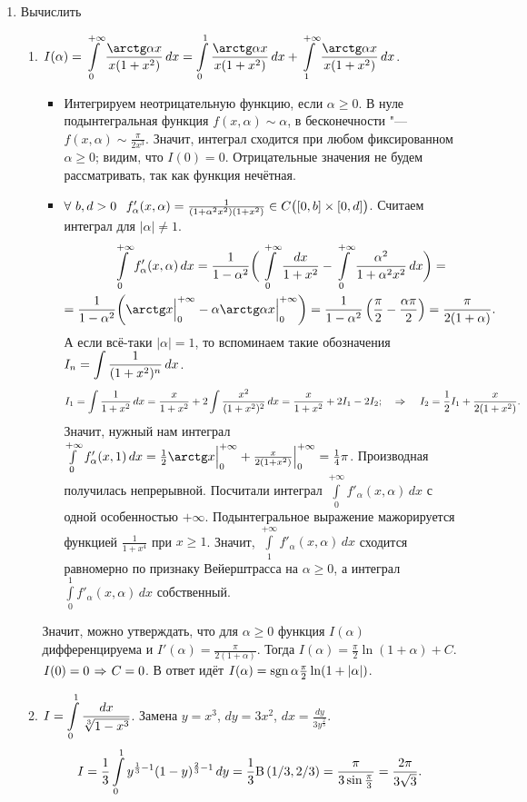 \documentclass{article}
\begin{document}
\begin{enumerate}
\item Вычислить
\begin{enumerate}
\item $I(\alpha)=\ds\int\limits_0^{+\infty}\frac{\arctg\alpha x}{x(1+x^2)}\,dx=\int\limits_0^{1}\frac{\arctg\alpha x}{x(1+x^2)}\,dx+\int\limits_1^{+\infty}\frac{\arctg\alpha x}{x(1+x^2)}\,dx$.
\begin{itemize}
\item Интегрируем неотрицательную функцию, если $\alpha\ge0$. В нуле подынтегральная функция $f(x,\alpha)\sim \alpha$, в бесконечности "--- $f(x,\alpha)\sim \frac{\pi}{2x^3}$. Значит, интеграл сходится при любом фиксированном $\alpha\ge0$; видим, что $I(0)=0$. Отрицательные значения не будем рассматривать, так как функция нечётная.
\item $\forall\ b,d>0\hskip .75em plus.1em minus.08em\relax f'_{\alpha}(x,\alpha)=\frac1{(1+\alpha^2x^2)(1+x^2)}\in C\big([0,b]\times[0,d]\big)$. Считаем интеграл для $|\alpha|\ne1$.
\begin{multline*}\intop_0^{+\infty}f'_{\alpha}(x,\alpha)\,dx=\frac1{1-\alpha^2}\bigg(\intop_0^{+\infty}\frac{dx}{1+x^2}-\intop_0^{+\infty}\frac{\alpha^2}{1+\alpha^2x^2}\,dx\bigg)=\\
=\frac1{1-\alpha^2}\bigg(\arctg x\Big|_0^{+\infty}-\alpha\arctg\alpha x\Big|_0^{+\infty}\bigg)=\frac1{1-\alpha^2}\left(\frac{\pi}2-\frac{\alpha\pi}2\right)=\frac{\pi}{2(1+\alpha)}.\end{multline*}
А если всё-таки $|\alpha|=1$, то вспоминаем такие обозначения $I_n=\displaystyle\int\frac1{(1+x^2)^n}\,dx$.
\[I_1=\int\frac{1}{1+x^2}\,dx=\frac x{1+x^2}+2\int \frac{x^2}{(1+x^2)^2}\,dx=\frac x{1+x^2}+2I_1-2I_2;\quad\hspace{1pt plus1pt}\Rightarrow\hspace{1pt plus1pt}\quad I_2=\frac12I_1+\frac x{2(1+x^2)}.\]
Значит, нужный нам интеграл $\int\limits_0^{+\infty}f'_{\alpha}(x,1)\,dx=\frac12\arctg x\Big|_0^{+\infty}+\frac{x}{2(1+x^2)}\Big|_0^{+\infty}=\frac14\pi$. Производная получилась непрерывной. Посчитали интеграл $\int\limits_0^{+\infty}f'_{\alpha}(x,\alpha)\,dx$ с одной особенностью $+\infty$. Подынтегральное выражение мажорируется функцией $\frac1{1+x^4}$ при $x\ge1$. Значит, $\int\limits_1^{+\infty}f'_{\alpha}(x,\alpha)\,dx$ сходится равномерно по признаку Вейерштрасса на $\alpha\ge0$, а интеграл $\int\limits_0^1f'_{\alpha}(x,\alpha)\,dx$ собственный.
\end{itemize}
Значит, можно утверждать, что для $\alpha\ge0$ функция $I(\alpha)$ дифференцируема и $I'(\alpha)=\frac{\pi}{2(1+\alpha)}$. Тогда $I(\alpha)=\frac{\pi}2\ln(1+\alpha)+C$. $I(0)=0\imp C=0$. В ответ идёт $I(\alpha)=\operatorname{sgn}\alpha\frac{\pi}2\ln(1+|\alpha|)$.
\item $I=\displaystyle\int\limits_0^1\frac{dx}{\sqrt[3]{1-x^3}}$. Замена $y=x^3$, $dy=3x^2$, $dx=\frac{dy}{3y^{\frac23}}$.
\[I=\frac13\intop_0^1y^{\frac13-1}(1-y)^{\frac23-1}\,dy=\frac13{\rm B}\left(1/3,2/3\right)=\frac{\pi}{3\sin\frac{\pi}3}=\frac{2\pi}{3\sqrt3}.\]
\end{enumerate}
\end{enumerate}\newpage
\end{document}
